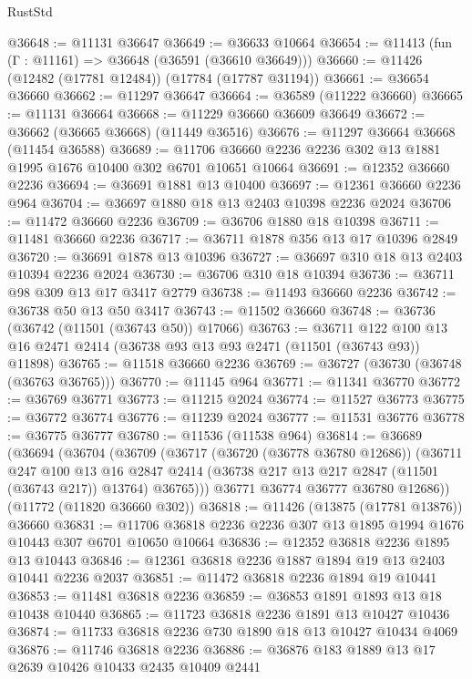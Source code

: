 \begin{lexlean}{RustStd}
\begin{coremodule}
@36648 := @11131 @36647
@36649 := @36633 @10664
@36654 := @11413 (fun (Γ : @11161) => @36648 (@36591 (@36610 @36649)))
@36660 := @11426 (@12482 (@17781 @12484)) (@17784 (@17787 @31194))
@36661 := @36654 @36660
@36662 := @11297 @36647
@36664 := @36589 (@11222 @36660)
@36665 := @11131 @36664
@36668 := @11229 @36660 @36609 @36649
@36672 := @36662 (@36665 @36668) (@11449 @36516)
@36676 := @11297 @36664 @36668 (@11454 @36588)
@36689 := @11706 @36660 @2236 @2236 @302 @13 @1881 @1995 @1676 @10400 @302 @6701 @10651 @10664
@36691 := @12352 @36660 @2236
@36694 := @36691 @1881 @13 @10400
@36697 := @12361 @36660 @2236 @964
@36704 := @36697 @1880 @18 @13 @2403 @10398 @2236 @2024
@36706 := @11472 @36660 @2236
@36709 := @36706 @1880 @18 @10398
@36711 := @11481 @36660 @2236
@36717 := @36711 @1878 @356 @13 @17 @10396 @2849
@36720 := @36691 @1878 @13 @10396
@36727 := @36697 @310 @18 @13 @2403 @10394 @2236 @2024
@36730 := @36706 @310 @18 @10394
@36736 := @36711 @98 @309 @13 @17 @3417 @2779
@36738 := @11493 @36660 @2236
@36742 := @36738 @50 @13 @50 @3417
@36743 := @11502 @36660
@36748 := @36736 (@36742 (@11501 (@36743 @50)) @17066)
@36763 := @36711
    @122
    @100
    @13
    @16
    @2471
    @2414
    (@36738 @93 @13 @93 @2471 (@11501 (@36743 @93)) @11898)
@36765 := @11518 @36660 @2236
@36769 := @36727 (@36730 (@36748 (@36763 @36765)))
@36770 := @11145 @964
@36771 := @11341 @36770
@36772 := @36769 @36771
@36773 := @11215 @2024
@36774 := @11527 @36773
@36775 := @36772 @36774
@36776 := @11239 @2024
@36777 := @11531 @36776
@36778 := @36775 @36777
@36780 := @11536 (@11538 @964)
@36814 := @36689
    (@36694
      (@36704
        (@36709
          (@36717
            (@36720 (@36778 @36780 @12686))
            (@36711
              @247
              @100
              @13
              @16
              @2847
              @2414
              (@36738 @217 @13 @217 @2847 (@11501 (@36743 @217)) @13764)
              @36765)))
        @36771
        @36774
        @36777
        @36780
        @12686))
    (@11772 (@11820 @36660 @302))
@36818 := @11426 (@13875 (@17781 @13876)) @36660
@36831 := @11706 @36818 @2236 @2236 @307 @13 @1895 @1994 @1676 @10443 @307 @6701 @10650 @10664
@36836 := @12352 @36818 @2236 @1895 @13 @10443
@36846 := @12361 @36818 @2236 @1887 @1894 @19 @13 @2403 @10441 @2236 @2037
@36851 := @11472 @36818 @2236 @1894 @19 @10441
@36853 := @11481 @36818 @2236
@36859 := @36853 @1891 @1893 @13 @18 @10438 @10440
@36865 := @11723 @36818 @2236 @1891 @13 @10427 @10436
@36874 := @11733 @36818 @2236 @730 @1890 @18 @13 @10427 @10434 @4069
@36876 := @11746 @36818 @2236
@36886 := @36876 @183 @1889 @13 @17 @2639 @10426 @10433 @2435 @10409 @2441

\end{coremodule}
\end{lexlean}
